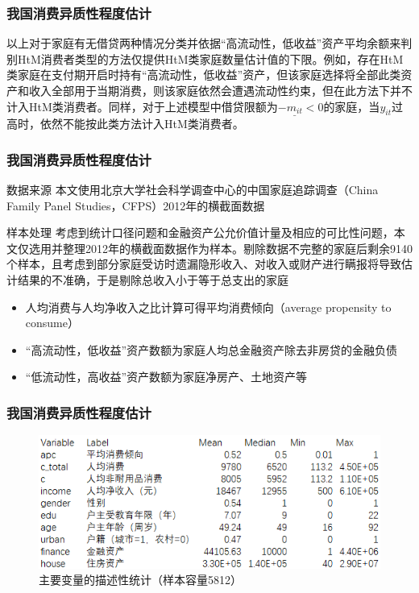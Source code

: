 \documentclass{beamer}
\begin{document}
\begin{frame}
\frametitle{我国消费异质性程度估计}
以上对于家庭有无借贷两种情况分类并依据“高流动性，低收益”资产平均余额来判别HtM消费者类型的方法仅提供HtM类家庭数量估计值的下限。例如，存在HtM类家庭在支付期开启时持有“高流动性，低收益”资产，但该家庭选择将全部此类资产和收入全部用于当期消费，则该家庭依然会遭遇流动性约束，但在此方法下并不计入HtM类消费者。同样，对于上述模型中借贷限额为$-\underline{m_{it}}<0$的家庭，当$y_{it}$过高时，依然不能按此类方法计入HtM类消费者。
\end{frame}

\begin{frame}
\frametitle{我国消费异质性程度估计}
\begin{block}{数据来源}
本文使用北京大学社会科学调查中心的中国家庭追踪调查（China Family Panel Studies，CFPS）2012年的横截面数据
\end{block}

\begin{block}{样本处理}
考虑到统计口径问题和金融资产公允价值计量及相应的可比性问题，本文仅选用并整理2012年的横截面数据作为样本。剔除数据不完整的家庭后剩余9140个样本，且考虑到部分家庭受访时遗漏隐形收入、对收入或财产进行瞒报将导致估计结果的不准确，于是剔除总收入小于等于总支出的家庭
\begin{itemize}
\item 人均消费与人均净收入之比计算可得平均消费倾向（average propensity to consume）
\item “高流动性，低收益”资产数额为家庭人均总金融资产除去非房贷的金融负债
\item “低流动性，高收益”资产数额为家庭净房产、土地资产等
 \end{itemize}
\end{block}
\end{frame}

\begin{frame}
\frametitle{我国消费异质性程度估计}
\begin{figure}
\includegraphics[width=0.8\linewidth]{data_1}
\caption{主要变量的描述性统计（样本容量5812）}
\end{figure}
\end{frame}
\end{document}
